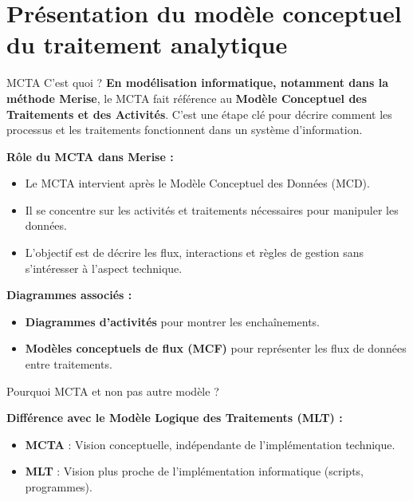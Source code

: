 \documentclass{beamer}
\begin{document}
\section{Présentation du modèle conceptuel du traitement analytique}

\begin{frame}{MCTA C'est quoi ?}
    \textbf{En modélisation informatique, notamment dans la méthode Merise}, le MCTA fait référence au 
    \textbf{Modèle Conceptuel des Traitements et des Activités}. C'est une étape clé pour décrire comment les processus et les traitements fonctionnent dans un système d'information.
    
    \vspace{1em}
    \textbf{Rôle du MCTA dans Merise :}
    \begin{itemize}
        \item Le MCTA intervient après le Modèle Conceptuel des Données (MCD).
        \item Il se concentre sur les activités et traitements nécessaires pour manipuler les données.
        \item L'objectif est de décrire les flux, interactions et règles de gestion sans s'intéresser à l'aspect technique.
    \end{itemize}
    
    \vspace{1em}
    \textbf{Diagrammes associés :}
    \begin{itemize}
        \item \textbf{Diagrammes d'activités} pour montrer les enchaînements.
        \item \textbf{Modèles conceptuels de flux (MCF)} pour représenter les flux de données entre traitements.
    \end{itemize}

\end{frame}

\begin{frame}{Pourquoi MCTA et non pas autre modèle ?}

    
    \textbf{Différence avec le Modèle Logique des Traitements (MLT) :}
    \begin{itemize}
        \item \textbf{MCTA} : Vision conceptuelle, indépendante de l'implémentation technique.
        \item \textbf{MLT} : Vision plus proche de l'implémentation informatique (scripts, programmes).
    \end{itemize}
    
\end{frame}
\end{document}
